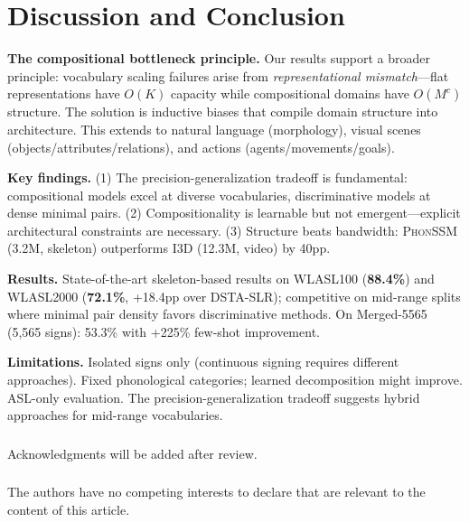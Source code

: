 \documentclass[runningheads]{llncs}
\newcommand{\phonssm}{\textsc{PhonSSM}}
\begin{document}
\section{Discussion and Conclusion}

\textbf{The compositional bottleneck principle.} Our results support a broader principle: vocabulary scaling failures arise from \textit{representational mismatch}---flat representations have $O(K)$ capacity while compositional domains have $O(M^c)$ structure. The solution is inductive biases that compile domain structure into architecture. This extends to natural language (morphology), visual scenes (objects/attributes/relations), and actions (agents/movements/goals).

\textbf{Key findings.} (1) The precision-generalization tradeoff is fundamental: compositional models excel at diverse vocabularies, discriminative models at dense minimal pairs. (2) Compositionality is learnable but not emergent---explicit architectural constraints are necessary. (3) Structure beats bandwidth: \phonssm{} (3.2M, skeleton) outperforms I3D (12.3M, video) by 40pp.

\textbf{Results.} State-of-the-art skeleton-based results on WLASL100 (\textbf{88.4\%}) and WLASL2000 (\textbf{72.1\%}, +18.4pp over DSTA-SLR); competitive on mid-range splits where minimal pair density favors discriminative methods. On Merged-5565 (5,565 signs): 53.3\% with +225\% few-shot improvement.

\textbf{Limitations.} Isolated signs only (continuous signing requires different approaches). Fixed phonological categories; learned decomposition might improve. ASL-only evaluation. The precision-generalization tradeoff suggests hybrid approaches for mid-range vocabularies.

\begin{credits}
\subsubsection{\ackname}
Acknowledgments will be added after review.

\subsubsection{\discintname}
The authors have no competing interests to declare that are relevant to the content of this article.
\end{credits}



\end{document}
